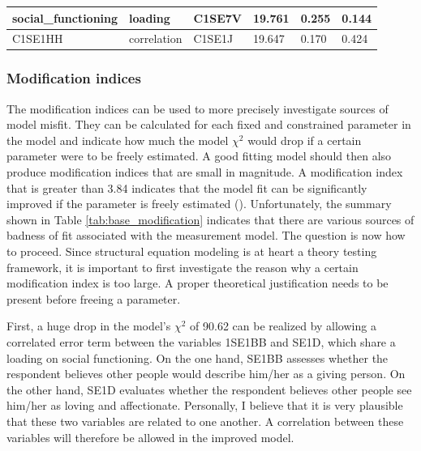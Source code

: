 \documentclass[11pt]{article}
\begin{document}
\begin{table}[h!]
{\begin{tabular}{|l|l|l|l|l|l|}
social\_functioning     & loading            & C1SE7V                   & 19.761                      &  0.255                                                                       &  0.144 \\ \hline
C1SE1HH                 & correlation        & C1SE1J                   & 19.647                      &  0.170                                                                       &  0.424 \\ \hline
\end{tabular}                                                                                                    
}
\end{table}

\subsubsection{Modification indices}

The modification indices can be used to more precisely investigate sources of
model misfit. They can be calculated for each fixed and constrained parameter in
the model and indicate how much the model $\chi^2$ would drop if a certain
parameter were to be freely estimated. A good fitting model should then also
produce modification indices that are small in magnitude. A modification index
that is greater than 3.84 indicates that the model fit can be significantly
improved if the parameter is freely estimated (\cite{brown2015}). Unfortunately,
the summary shown in Table \ref{tab:base_modification} indicates that there are
various sources of badness of fit associated with the measurement model. The
question is now how to proceed. Since structural equation modeling is at heart
a theory testing framework, it is important to first investigate the reason why
a certain modification index is too large. A proper theoretical justification
needs to be present before freeing a parameter.

First, a huge drop in the model's $\chi^2$ of 90.62 can be realized by allowing
a correlated error term between the variables 1SE1BB and SE1D, which share a
loading on social functioning. On the one hand, SE1BB assesses whether the 
respondent believes other people would describe him/her as a giving person.
On the other hand, SE1D evaluates whether the respondent believes other people
see him/her as loving and affectionate. Personally, I believe that it is very
plausible that these two variables are related to one another. A correlation
between these variables will therefore be allowed in the improved model.
\end{document}
